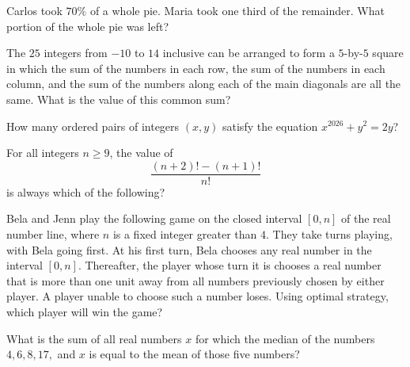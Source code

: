 \documentclass[11pt]{article}
\begin{document}
\problem Carlos took $70\%$ of a whole pie. Maria took one third of the remainder. What portion of the whole pie was left?

\problem The $25$ integers from $-10$ to $14$ inclusive can be arranged to form a $5$-by-$5$ square in which the sum of the numbers in each row, the sum of the numbers in each column, and the sum of the numbers along each of the main diagonals are all the same. What is the value of this common sum?

\problem How many ordered pairs of integers $(x,y)$ satisfy the equation $x^{2026}+y^2=2y$?


\problem For all integers $n\ge 9$, the value of
\[
\frac{(n+2)!-(n+1)!}{n!}
\]
is always which of the following?


\problem Bela and Jenn play the following game on the closed interval $[0,n]$ of the real number line, where $n$ is a fixed integer greater than $4$. They take turns playing, with Bela going first. At his first turn, Bela chooses any real number in the interval $[0,n]$. Thereafter, the player whose turn it is chooses a real number that is more than one unit away from all numbers previously chosen by either player. A player unable to choose such a number loses. Using optimal strategy, which player will win the game?

\problem What is the sum of all real numbers $x$ for which the median of the numbers $4,6,8,17,$ and $x$ is equal to the mean of those five numbers?
\end{document}
